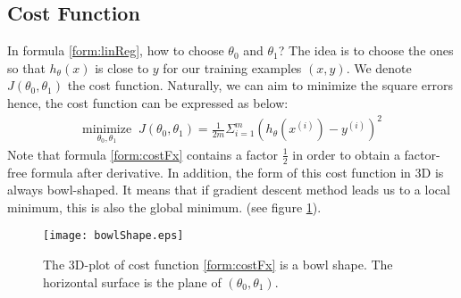 \subsection{Cost Function}
In formula \eqref{form:linReg}, how to choose $\theta_0$ and $\theta_1$? The idea is to choose the ones so that $h_{\theta}(x)$ is close to $y$ for our training examples $(x, y)$. We denote $J(\theta_0, \theta_1)$ the cost function. Naturally, we can aim to minimize the square errors hence, the cost function can be expressed as below:
\begin{align}
\underset{\theta_0, \theta_1}{\text{minimize}} \; \; J(\theta_0, \theta_1) = \frac{1}{2m}\Sigma_{i = 1}^{m} (h_{\theta}(x^{(i)}) - y^{(i)})^2
\label{form:costFx}
\end{align}
Note that formula \eqref{form:costFx} contains a factor $\frac{1}{2}$ in order to obtain a factor-free formula after derivative. In addition, the form of this cost function in 3D is always bowl-shaped. It means that if gradient descent method leads us to a local minimum, this is also the global minimum. (see figure \ref{fig:bowlShape}).  
\begin{figure}[!ht]
\centering
\texttt{[image: bowlShape.eps]}
\caption[Cost Function Shape]{The 3D-plot of cost function \eqref{form:costFx} is a bowl shape. The horizontal surface is the plane of $(\theta_0, \theta_1)$.}
\label{fig:bowlShape}
\end{figure}

